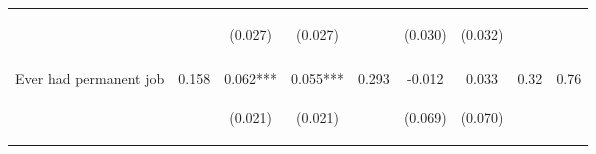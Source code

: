 \begin{tabular}{lcccccccc}
 & \begin{footnotesize}\end{footnotesize} & \begin{footnotesize}(0.027)\end{footnotesize} & \begin{footnotesize}(0.027)\end{footnotesize} & \begin{footnotesize}\end{footnotesize} & \begin{footnotesize}(0.030)\end{footnotesize} & \begin{footnotesize}(0.032)\end{footnotesize} & \begin{footnotesize}\end{footnotesize} & \begin{footnotesize}\end{footnotesize}\\
 & \begin{footnotesize}\end{footnotesize} & \begin{footnotesize}[0.021]\end{footnotesize} & \begin{footnotesize}[0.021]\end{footnotesize} & \begin{footnotesize}\end{footnotesize} & \begin{footnotesize}[0.505]\end{footnotesize} & \begin{footnotesize}[0.410]\end{footnotesize} & \begin{footnotesize}\end{footnotesize} & \begin{footnotesize}\end{footnotesize}\\
\noalign{\smallskip}Ever had permanent job & 0.158 & 0.062*** & 0.055*** & 0.293 & -0.012 & 0.033 & 0.32 & 0.76\\
 & \begin{footnotesize}\end{footnotesize} & \begin{footnotesize}(0.021)\end{footnotesize} & \begin{footnotesize}(0.021)\end{footnotesize} & \begin{footnotesize}\end{footnotesize} & \begin{footnotesize}(0.069)\end{footnotesize} & \begin{footnotesize}(0.070)\end{footnotesize} & \begin{footnotesize}\end{footnotesize} & \begin{footnotesize}\end{footnotesize}\\

\end{tabular}

